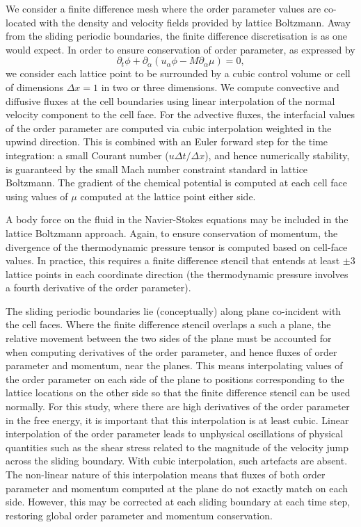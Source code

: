 \documentclass[8.5pt,twoside,twocolumn]{article}
\begin{document}
We consider a finite difference mesh where the order parameter
values are co-located with the density and velocity fields provided
by lattice Boltzmann. Away from the sliding periodic boundaries, the
finite difference discretisation is as one would expect.
In order to ensure conservation of order parameter, as expressed by
\begin{equation}
\partial_t \phi + \partial_\alpha (u_\alpha \phi - M\partial_\alpha \mu) = 0,
\end{equation}
we consider each lattice point to be surrounded by a cubic control volume or
cell
of dimensions $\Delta x = 1$ in two or three dimensions.
We compute convective and diffusive fluxes at the cell boundaries using
linear interpolation of the normal velocity component to the cell face.
For the advective fluxes, the interfacial values of the order parameter
are computed via cubic interpolation weighted in the upwind direction.
This is combined with an Euler forward step for the time integration:
a small Courant number ($u\Delta t/\Delta x$), and hence numerically
stability, is guaranteed by the small Mach number constraint
standard in lattice Boltzmann. The gradient of the chemical potential
is computed at each cell face using values of $\mu$ computed at the
lattice point either side.

A body force on the fluid in the Navier-Stokes equations may be
included in the lattice Boltzmann approach. Again, to ensure conservation
of momentum, the divergence of the thermodynamic pressure tensor is
computed based on cell-face values. In practice, this requires a
finite difference stencil
that entends at least $\pm 3$ lattice points in each coordinate direction
(the thermodynamic pressure involves a fourth derivative of the order
parameter).

The sliding periodic boundaries lie (conceptually) along plane
co-incident with the cell faces. Where the finite difference stencil 
overlaps a such a plane, the relative movement between the two sides
of the plane must be accounted for when computing derivatives of the
order parameter, and hence fluxes of order parameter and momentum,
near the planes. This means interpolating values of the order parameter
on each side of the plane to positions corresponding to the lattice
locations on the other side so that the finite difference stencil
can be used normally. For this study, where there are high derivatives
of the order parameter in the free energy, it is important that this
interpolation is at least cubic. Linear interpolation of the order
parameter leads to unphysical oscillations of physical quantities
such as the shear stress related to the magnitude of the velocity jump
across the sliding boundary.
With cubic interpolation, such artefacts are absent. The non-linear
nature of this interpolation means that fluxes of both order parameter
and momentum computed at the plane do not exactly match on each side.
However, this may be corrected at each sliding boundary at each time
step, restoring global order parameter and momentum conservation.



\footnotesize{
}
\end{document}
